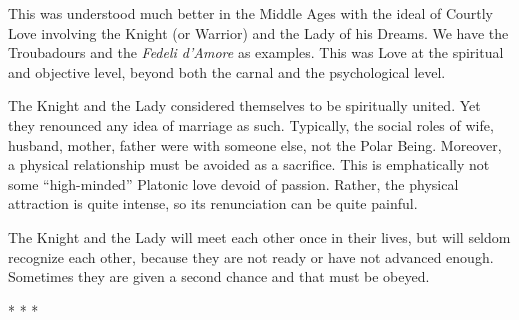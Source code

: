 This was understood much better in the Middle Ages with the ideal of Courtly Love involving the Knight (or Warrior) and the Lady of his Dreams. We have the Troubadours and the \emph{Fedeli d'Amore} as examples. This was Love at the spiritual and objective level, beyond both the carnal and the psychological level.

The Knight and the Lady considered themselves to be spiritually united. Yet they renounced any idea of marriage as such. Typically, the social roles of wife, husband, mother, father were with someone else, not the Polar Being. Moreover, a physical relationship must be avoided as a sacrifice. This is emphatically not some “high-minded” Platonic love devoid of passion. Rather, the physical attraction is quite intense, so its renunciation can be quite painful.

The Knight and the Lady will meet each other once in their lives, but will seldom recognize each other, because they are not ready or have not advanced enough. Sometimes they are given a second chance and that must be obeyed.




\begin{center}* * *\end{center}

